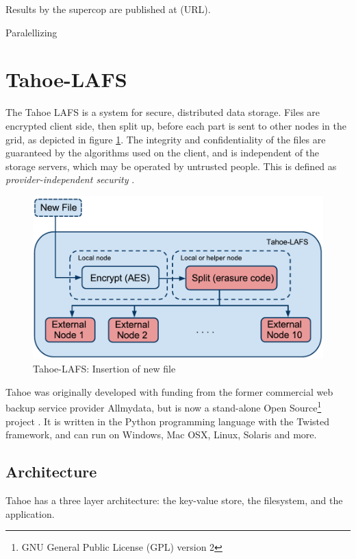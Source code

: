 \documentclass[english,12pt,a4paper]{book}
\begin{document}
Results by the supercop are published at (URL).


Paralellizing

\section{Tahoe-LAFS}

The Tahoe \ac{LAFS} is a system for secure,
distributed data storage. Files are encrypted client side, then
split up, before each part is sent to other nodes in the grid, as depicted in
figure \ref{fig:tahoeinsertion}. The integrity and confidentiality of the files
are guaranteed by the algorithms used on the client, and is independent of the
storage servers, which may be operated by untrusted people. This is defined as
\emph{provider-independent security} \cite{t_tahoe}.

\begin{figure}[h!]
    \centering
    \includegraphics[width=0.9\columnwidth]{Tahoe-newfile.pdf}
    \caption{Tahoe-LAFS: Insertion of new file}
    \label{fig:tahoeinsertion}
\end{figure}

Tahoe was originally developed with funding from the former commercial web
backup service provider Allmydata, but is now a stand-alone Open
Source\footnote{GNU General Public License (GPL) version 2} project
\cite{t_ars}.  It is written in the Python programming language with the Twisted
framework, and can run on Windows, Mac OSX, Linux, Solaris and more.

\subsection{Architecture}

Tahoe has a three layer architecture: the key-value store, the filesystem, and
the application.
\end{document}

